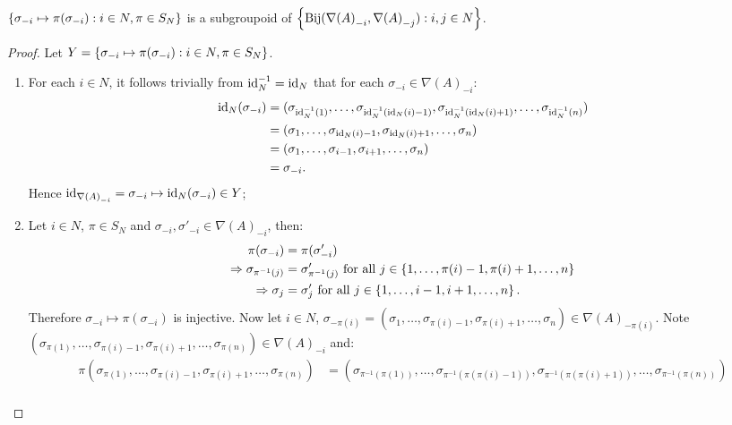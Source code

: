 \begin{proposition} \label{prop:secondgroupoidprop}
	$\left\{\sigma_{-i} \mapsto \pi(\sigma_{-i}): i \in N, \pi \in S_N\right\}$ is a subgroupoid of $\left\{\operatorname*{Bij}({\nabla(A)}_{-i}, {\nabla(A)}_{-j}): i, j \in N\right\}$.
	
	\begin{proof}
		Let $Y = \left\{\sigma_{-i} \mapsto \pi(\sigma_{-i}): i \in N, \pi \in S_N\right\}$.

		\begin{enumerate}
			\item For each $i \in N$, it follows trivially from $\text{id}_N^{-1} = \text{id}_N$ that for each $\sigma_{-i} \in {\nabla(A)}_{-i}$:
			\begin{align*}
				\textstyle\text{id}_N(\sigma_{-i}) &= (\sigma_{\text{id}_N^{-1}(1)}, \ldots, \sigma_{\text{id}_N^{-1}\left(\text{id}_N(i)-1\right)}, \sigma_{\text{id}_N^{-1}\left(\text{id}_N(i)+1\right)}, \ldots, \sigma_{\text{id}_N^{-1}(n)})\\
				&= (\sigma_1, \ldots, \sigma_{\text{id}_N(i)-1}, \sigma_{\text{id}_N(i)+1}, \ldots, \sigma_n)\\
				&= (\sigma_1, \ldots, \sigma_{i-1}, \sigma_{i+1}, \ldots, \sigma_n) \\
				&= \sigma_{-i}.
			\end{align*}
			Hence $\text{id}_{{\nabla(A)}_{-i}} = \sigma_{-i} \mapsto \text{id}_N(\sigma_{-i}) \in Y$;
			\item Let $i \in N$, $\pi \in S_N$ and $\sigma_{-i}, \sigma'_{-i} \in {\nabla(A)}_{-i}$, then:
			\begin{align*}
				\pi(\sigma_{-i}) &= \pi(\sigma'_{-i}) \\
				\Rightarrow \sigma_{\pi^{-1}(j)} &= \sigma'_{\pi^{-1}(j)} \text{ for all } j \in \left\{1, \ldots, \pi(i)-1, \pi(i)+1, \ldots, n\right\} \\
				\Rightarrow \sigma_j &= \sigma'_j \text{ for all } j \in \left\{1, \ldots, i-1, i+1, \ldots, n\right\}.
			\end{align*}			
			Therefore $\sigma_{-i} \mapsto \pi(\sigma_{-i})$ is injective. Now let $i \in N$, $\sigma_{-\pi(i)} = (\sigma_1, \ldots, \sigma_{\pi(i)-1}, \sigma_{\pi(i)+1}, \ldots, \sigma_n) \in {\nabla(A)}_{-\pi(i)}$. Note $(\sigma_{\pi(1)}, \ldots, \sigma_{\pi(i)-1}, \sigma_{\pi(i)+1}, \ldots, \sigma_{\pi(n)}) \in {\nabla(A)}_{-i}$ and:
			\begin{align*}
				\pi(\sigma_{\pi(1)}, \ldots, \sigma_{\pi(i)-1}, \sigma_{\pi(i)+1}, \ldots, \sigma_{\pi(n)}) &= (\sigma_{\pi^{-1}(\pi(1))}, \ldots, \sigma_{\pi^{-1}(\pi(\pi(i)-1))}, \sigma_{\pi^{-1}(\pi(\pi(i)+1))}, \ldots, \sigma_{\pi^{-1}(\pi(n))})\\

\end{align*}
\end{enumerate}
\end{proof}
\end{proposition}
